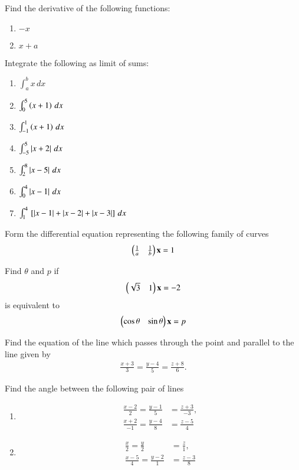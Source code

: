 \item Find the derivative of the following functions:
%
\begin{enumerate}
\item  $-x$
\item  $x+a$
\end{enumerate}
%
\item Integrate the following as limit of sums:
\begin{enumerate}[label = (\roman*)]
\item $\int_{a}^{b}x\, dx$
\item $\int_{0}^{5}\left(x+1\right)\, dx$
\item $\int_{-1}^{1}\left(x+1\right)\, dx$
\item $\int_{-5}^{5}\left\vert x+2\right\vert\, dx$
\item $\int_{2}^{8}\left\vert x-5\right\vert\, dx$
\item $\int_{0}^{4}\left\vert x-1\right\vert\, dx$
\item $\int_{1}^{4}{}\left[\left\vert x-1\right\vert+\left\vert x-2\right\vert+\left\vert x-3\right\vert\right]\, dx$
\end{enumerate}
%
\item Form the differential equation representing the following family of curves 
\begin{align}
\begin{pmatrix}\frac{1}{a} & \frac{1}{b}\end{pmatrix}\mathbf{x} = 1
\end{align}
%
\item Find $\theta$ and $p$ if 
%
\begin{align}
\begin{pmatrix}\sqrt{3} & 1\end{pmatrix}\mathbf{x} = -2
\end{align}
%
is equivalent to
%
\begin{align}
\begin{pmatrix}\cos\theta & \sin\theta\end{pmatrix}\mathbf{x} = p
\end{align}
\item Find the equation of the line which passes through  the point  and parallel to the line given by 
\begin{align}
\frac{x+3}{3} = \frac{y-4}{5} = \frac{z+8}{6}. 
\end{align}
\item Find the angle between the following pair of lines
\begin{enumerate}
\item 
\begin{align}
\frac{x-2}{2} = \frac{y-1}{5} &= \frac{z+3}{-3}, 
\\
\frac{x+2}{-1} = \frac{y-4}{8} &= \frac{z-5}{4} 
\end{align}
\item 
\begin{align}
\frac{x}{2} = \frac{y}{2} &= \frac{z}{1}, 
\\
\frac{x-5}{4} = \frac{y-2}{1} &= \frac{z-3}{8} 
\end{align}
\end{enumerate}
